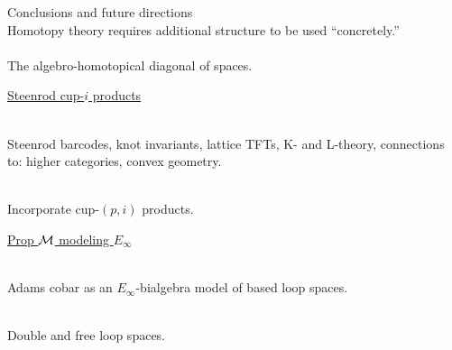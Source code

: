 
\begin{frame}{Conclusions and future directions}
	\pause
	 \\
	Homotopy theory requires additional structure to be used ``concretely.'' \\

	\medskip\pause
	 \\
	The algebro-homotopical diagonal of spaces.

	\medskip\pause
	\underline{Steenrod cup-$i$ products}

	\medskip\pause
	 \\
	Steenrod barcodes, knot invariants, lattice TFTs, K- and L-theory, connections to: higher categories, convex geometry.

	\smallskip\pause
	 \\
	Incorporate cup-$(p,i)$ products.

	\medskip\pause
	\underline{Prop $\mathcal{M}$ modeling $E_\infty$}

	\medskip\pause
	 \\
	Adams cobar as an $E_\infty$-bialgebra model of based loop spaces.

	\smallskip\pause
	 \\
	Double and free loop spaces.
\end{frame}